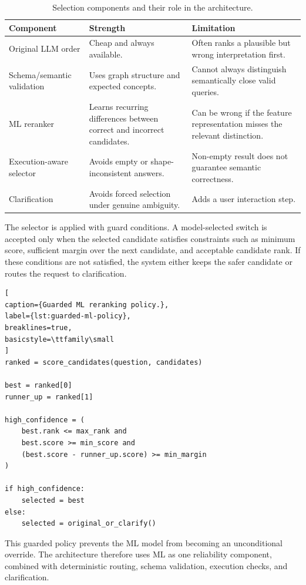\documentclass[
  12pt,
  english,
  oneside]{report}
\begin{document}
\begin{table}[htbp]
\centering
\caption{Selection components and their role in the architecture.}
\label{tab:selection-components}
\small
\begin{tabularx}{\textwidth}{
>{\raggedright\arraybackslash}p{3.5cm}
>{\raggedright\arraybackslash}p{4.8cm}
>{\raggedright\arraybackslash}X
}
\toprule
\textbf{Component} & \textbf{Strength} & \textbf{Limitation} \\
\midrule
Original LLM order & Cheap and always available. & Often ranks a plausible but wrong interpretation first. \\
Schema/semantic validation & Uses graph structure and expected concepts. & Cannot always distinguish semantically close valid queries. \\
ML reranker & Learns recurring differences between correct and incorrect candidates. & Can be wrong if the feature representation misses the relevant distinction. \\
Execution-aware selector & Avoids empty or shape-inconsistent answers. & Non-empty result does not guarantee semantic correctness. \\
Clarification & Avoids forced selection under genuine ambiguity. & Adds a user interaction step. \\
\bottomrule
\end{tabularx}
\end{table}

The selector is applied with guard conditions. A model-selected switch is accepted only when the selected candidate satisfies constraints such as minimum score, sufficient margin over the next candidate, and acceptable candidate rank. If these conditions are not satisfied, the system either keeps the safer candidate or routes the request to clarification.

\begin{lstlisting}[
caption={Guarded ML reranking policy.},
label={lst:guarded-ml-policy},
breaklines=true,
basicstyle=\ttfamily\small
]
ranked = score_candidates(question, candidates)

best = ranked[0]
runner_up = ranked[1]

high_confidence = (
    best.rank <= max_rank and
    best.score >= min_score and
    (best.score - runner_up.score) >= min_margin
)

if high_confidence:
    selected = best
else:
    selected = original_or_clarify()
\end{lstlisting}

This guarded policy prevents the ML model from becoming an unconditional override. The architecture therefore uses ML as one reliability component, combined with deterministic routing, schema validation, execution checks, and clarification.
\end{document}
